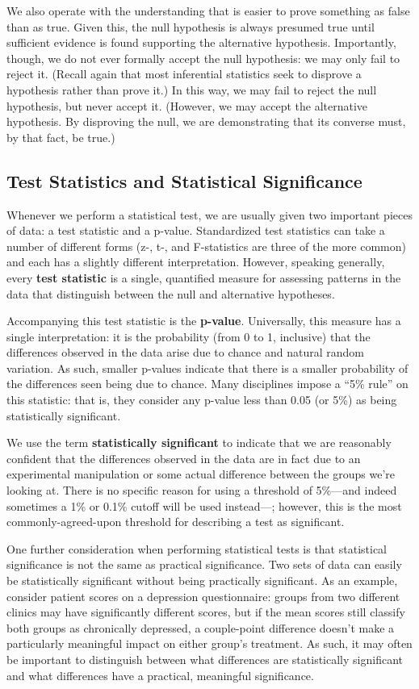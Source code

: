 We also operate with the understanding that is easier to prove something as false than as true. Given this, the null hypothesis is always presumed true until sufficient evidence is found supporting the alternative hypothesis. Importantly, though, we do not ever formally accept the null hypothesis: we may only fail to reject it. (Recall again that most inferential statistics seek to disprove a hypothesis rather than prove it.) In this way, we may fail to reject the null hypothesis, but never accept it. (However, we may accept the alternative hypothesis. By disproving the null, we are demonstrating that its converse must, by that fact, be true.)

\subsection{Test Statistics and Statistical Significance}
Whenever we perform a statistical test, we are usually given two important pieces of data: a test statistic and a p-value. Standardized test statistics can take a number of different forms (z-, t-, and F-statistics are three of the more common) and each has a slightly different interpretation. However, speaking generally, every \textbf{test statistic} is a single, quantified measure for assessing patterns in the data that distinguish between the null and alternative hypotheses.

Accompanying this test statistic is the \textbf{p-value}. Universally, this measure has a single interpretation: it is the probability (from 0 to 1, inclusive) that the differences observed in the data arise due to chance and natural random variation. As such, smaller p-values indicate that there is a smaller probability of the differences seen being due to chance. Many disciplines impose a ``5\% rule'' on this statistic: that is, they consider any p-value less than 0.05 (or 5\%) as being statistically significant.

We use the term \textbf{statistically significant} to indicate that we are reasonably confident that the differences observed in the data are in fact due to an experimental manipulation or some actual difference between the groups we're looking at. There is no specific reason for using a threshold of 5\%---and indeed sometimes a 1\% or 0.1\% cutoff will be used instead---; however, this is the most commonly-agreed-upon threshold for describing a test as significant.

One further consideration when performing statistical tests is that statistical significance is not the same as practical significance. Two sets of data can easily be statistically significant without being practically significant. As an example, consider patient scores on a depression questionnaire: groups from two different clinics may have significantly different scores, but if the mean scores still classify both groups as chronically depressed, a couple-point difference doesn't make a particularly meaningful impact on either group's treatment. As such, it may often be important to distinguish between what differences are statistically significant and what differences have a practical, meaningful significance.

